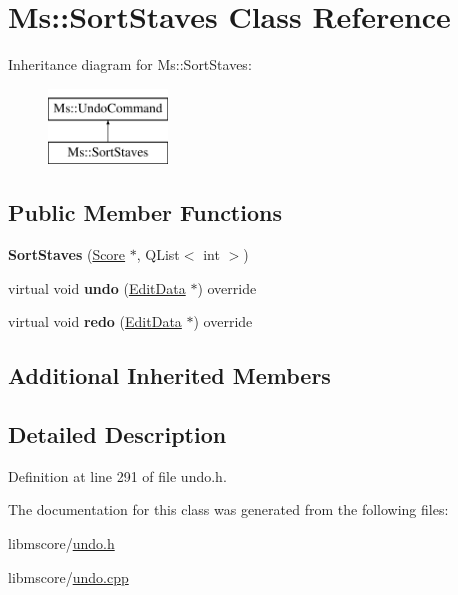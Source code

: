 \hypertarget{class_ms_1_1_sort_staves}{}\section{Ms\+:\+:Sort\+Staves Class Reference}
\label{class_ms_1_1_sort_staves}
Inheritance diagram for Ms\+:\+:Sort\+Staves\+:\begin{figure}[H]
\begin{center}
\leavevmode
\includegraphics[height=2.000000cm]{class_ms_1_1_sort_staves}
\end{center}
\end{figure}
\subsection*{Public Member Functions}
\begin{DoxyCompactItemize}
\item 
\mbox{\label{class_ms_1_1_sort_staves_a37558c9149fdaa746c7651c492cc6086}} 
{\bfseries Sort\+Staves} (\hyperlink{class_ms_1_1_score}{Score} $\ast$, Q\+List$<$ int $>$)
\item 
\mbox{\label{class_ms_1_1_sort_staves_ac3db0742daccfcef821036876f8e2cb0}} 
virtual void {\bfseries undo} (\hyperlink{class_ms_1_1_edit_data}{Edit\+Data} $\ast$) override
\item 
\mbox{\label{class_ms_1_1_sort_staves_a5241617ea04818921fe0a512d4f5cf01}} 
virtual void {\bfseries redo} (\hyperlink{class_ms_1_1_edit_data}{Edit\+Data} $\ast$) override
\end{DoxyCompactItemize}
\subsection*{Additional Inherited Members}


\subsection{Detailed Description}


Definition at line 291 of file undo.\+h.



The documentation for this class was generated from the following files\+:\begin{DoxyCompactItemize}
\item 
libmscore/\hyperlink{undo_8h}{undo.\+h}\item 
libmscore/\hyperlink{undo_8cpp}{undo.\+cpp}\end{DoxyCompactItemize}
